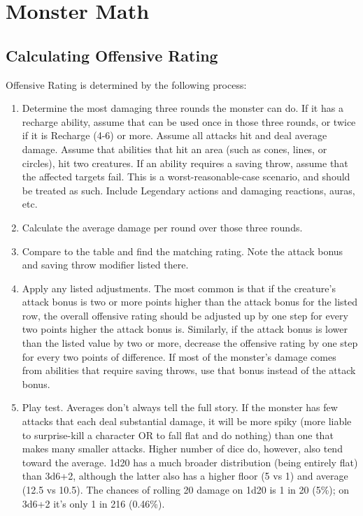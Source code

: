 \section{Monster Math}
\subsection{Calculating Offensive Rating}
Offensive Rating is determined by the following process:
\begin{enumerate}
	\item Determine the most damaging three rounds the monster can do. If it has a recharge ability, assume that can be used once in those three rounds, or twice if it is Recharge (4-6) or more. Assume all attacks hit and deal average damage. Assume that abilities that hit an area (such as cones, lines, or circles), hit two creatures. If an ability requires a saving throw, assume that the affected targets fail. This is a worst-reasonable-case scenario, and should be treated as such. Include Legendary actions and damaging reactions, auras, etc.
	\item Calculate the average damage per round over those three rounds.
	\item Compare to the  table and find the matching rating. Note the attack bonus and saving throw modifier listed there.
	\item Apply any listed adjustments. The most common is that if the creature's attack bonus is two or more points higher than the attack bonus for the listed row, the overall offensive rating should be adjusted up by one step for every two points higher the attack bonus is. Similarly, if the attack bonus is lower than the listed value by two or more, decrease the offensive rating by one step for every two points of difference. If most of the monster's damage comes from abilities that require saving throws, use that bonus instead of the attack bonus.
	\item Play test. Averages don't always tell the full story. If the monster has few attacks that each deal substantial damage, it will be more spiky (more liable to surprise-kill a character OR to fall flat and do nothing) than one that makes many smaller attacks. Higher number of dice do, however, also tend toward the average. 1d20 has a much broader distribution (being entirely flat) than 3d6+2, although the latter also has a higher floor (5 vs 1) and average (12.5 vs 10.5). The chances of rolling 20 damage on 1d20 is 1 in 20 (5\%); on 3d6+2 it's only 1 in 216 (0.46\%).
\end{enumerate}

